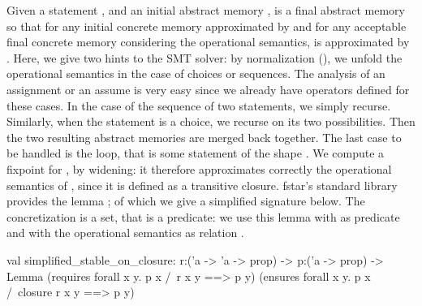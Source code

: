 \documentclass{llncs}
\begin{document}
Given a statement , and an initial abstract memory
,  is a final abstract memory so
that for any initial concrete memory  approximated by
 and for any acceptable final concrete memory
 considering the operational semantics,  is
approximated by .
%
Here, we give two hints to the SMT solver: by normalization
(), we unfold the operational semantics in the
case of choices or sequences.
%
The analysis of an assignment or an assume is very easy since we
already have operators defined for these cases.
%
In the case of the sequence of two statements, we simply recurse.
%
Similarly, when the statement is a choice, we recurse on its two
possibilities.
%
Then the two resulting abstract memories are merged back together.
%
The last case to be handled is the loop, that is some statement of
the shape .
%
We compute a fixpoint  for , by widening:
it therefore approximates correctly the operational semantics of
, since it is defined as a transitive closure.
%
\gls{fstar}'s standard library provides the lemma
; of which we give a simplified signature
below. The concretization  is a set, that is a
predicate: we use this lemma with  as predicate
 and with the operational semantics as relation
.
%
\begin{fstarcode}
val simplified_stable_on_closure: r:('a -> 'a -> prop) -> p:('a -> prop)
  -> Lemma (requires forall x y. p x /\ r x y ==> p y)
          (ensures forall x y. p x /\ closure r x y ==> p y)
\end{fstarcode}
\end{document}
